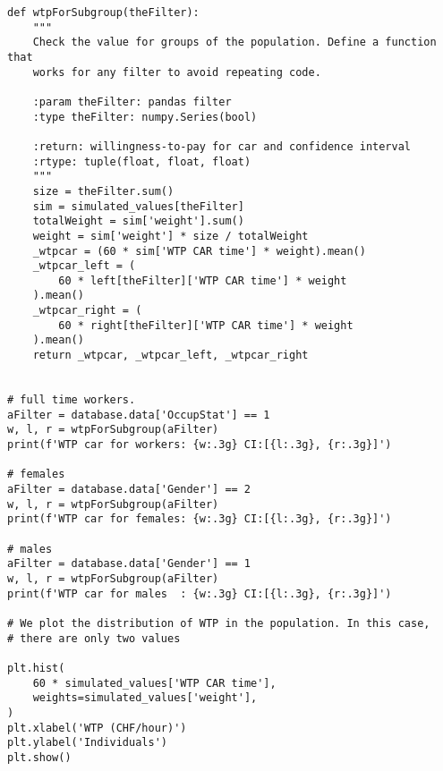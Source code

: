 \documentclass[12pt,a4paper]{article}
\begin{document}
\begin{lstlisting}[style=numbers]
def wtpForSubgroup(theFilter):
    """
    Check the value for groups of the population. Define a function that
    works for any filter to avoid repeating code.

    :param theFilter: pandas filter
    :type theFilter: numpy.Series(bool)

    :return: willingness-to-pay for car and confidence interval
    :rtype: tuple(float, float, float)
    """
    size = theFilter.sum()
    sim = simulated_values[theFilter]
    totalWeight = sim['weight'].sum()
    weight = sim['weight'] * size / totalWeight
    _wtpcar = (60 * sim['WTP CAR time'] * weight).mean()
    _wtpcar_left = (
        60 * left[theFilter]['WTP CAR time'] * weight
    ).mean()
    _wtpcar_right = (
        60 * right[theFilter]['WTP CAR time'] * weight
    ).mean()
    return _wtpcar, _wtpcar_left, _wtpcar_right


# full time workers.
aFilter = database.data['OccupStat'] == 1
w, l, r = wtpForSubgroup(aFilter)
print(f'WTP car for workers: {w:.3g} CI:[{l:.3g}, {r:.3g}]')

# females
aFilter = database.data['Gender'] == 2
w, l, r = wtpForSubgroup(aFilter)
print(f'WTP car for females: {w:.3g} CI:[{l:.3g}, {r:.3g}]')

# males
aFilter = database.data['Gender'] == 1
w, l, r = wtpForSubgroup(aFilter)
print(f'WTP car for males  : {w:.3g} CI:[{l:.3g}, {r:.3g}]')

# We plot the distribution of WTP in the population. In this case,
# there are only two values

plt.hist(
    60 * simulated_values['WTP CAR time'],
    weights=simulated_values['weight'],
)
plt.xlabel('WTP (CHF/hour)')
plt.ylabel('Individuals')
plt.show()
\end{lstlisting}



\clearpage



\end{document}
